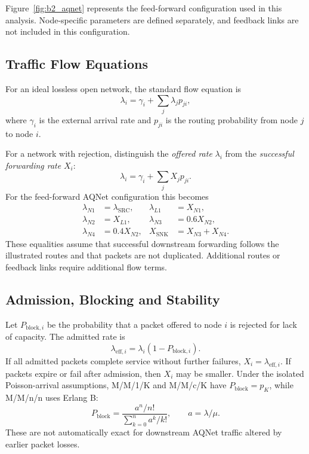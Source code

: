 Figure~\ref{fig:b2_aqnet} represents the feed-forward configuration
used in this analysis. Node-specific parameters are defined separately,
and feedback links are not included in this configuration.

\subsection{Traffic Flow Equations}
For an ideal lossless open network, the standard flow equation is
\begin{equation}
\lambda_i=\gamma_i+\sum_j\lambda_jp_{ji},
\label{eq:b2_ideal_flow}
\end{equation}
where $\gamma_i$ is the external arrival rate and $p_{ji}$ is the
routing probability from node $j$ to node $i$.

For a network with rejection, distinguish the \emph{offered rate}
$\lambda_i$ from the \emph{successful forwarding rate} $X_i$:
\begin{equation}
\lambda_i=\gamma_i+\sum_j X_jp_{ji}.
\label{eq:b2_actual_flow}
\end{equation}
For the feed-forward AQNet configuration this becomes
\begin{align}
\lambda_{N1}&=\lambda_{\mathrm{SRC}}, &
\lambda_{L1}&=X_{N1},\\
\lambda_{N2}&=X_{L1}, &
\lambda_{N3}&=0.6X_{N2},\\
\lambda_{N4}&=0.4X_{N2}, &
X_{\mathrm{SNK}}&=X_{N3}+X_{N4}.
\label{eq:b2_node_flows}
\end{align}
These equalities assume that successful downstream forwarding follows
the illustrated routes and that packets are not duplicated.
Additional routes or feedback links require additional flow terms.

\subsection{Admission, Blocking and Stability}
Let $P_{\mathrm{block},i}$ be the probability that a packet offered to
node $i$ is rejected for lack of capacity. The admitted rate is
\begin{equation}
\lambda_{\mathrm{eff},i}=\lambda_i(1-P_{\mathrm{block},i}).
\label{eq:b2_admitted}
\end{equation}
If all admitted packets complete service without further failures,
$X_i=\lambda_{\mathrm{eff},i}$. If packets expire or fail after admission,
then $X_i$ may be smaller. Under the isolated Poisson-arrival
assumptions, M/M/1/K and M/M/c/K have
$P_{\mathrm{block}}=p_K$, while M/M/n/n uses Erlang B:
\begin{equation}
P_{\mathrm{block}}=\frac{a^n/n!}{\displaystyle\sum_{k=0}^{n}a^k/k!},
\qquad a=\lambda/\mu.
\label{eq:b2_erlang_b}
\end{equation}
These are not automatically exact for downstream AQNet traffic altered
by earlier packet losses.

